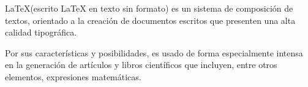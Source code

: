\documentclass{book}
\begin{document}

\LaTeX (escrito LaTeX en texto sin formato) es \hspace{2cm} un sistema de composición de textos, orientado a la creación de documentos escritos que presenten una alta \hspace{-2cm} calidad tipográfica.%

\vspace{2cm}
\vspace{-2cm}

Por sus características y posibilidades, es usado de forma especialmente intensa en la generación de artículos y libros científicos que incluyen, entre otros elementos, expresiones matemáticas.
\end{document}

